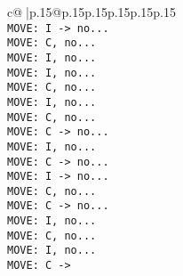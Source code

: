 \documentclass{article}
\begin{document}
{\begin{supertabular}{c@{$\;$}|p{.15\linewidth}@{}p{.15\linewidth}p{.15\linewidth}p{.15\linewidth}p{.15\linewidth}p{.15\linewidth}}
{{{\\ \tt  MOVE: I -> no...\\ \tt  MOVE: C, no...\\ \tt  MOVE: I, no...\\ \tt  MOVE: I, no...\\ \tt  MOVE: C, no...\\ \tt  MOVE: I, no...\\ \tt  MOVE: C, no...\\ \tt  MOVE: C -> no...\\ \tt  MOVE: I, no...\\ \tt  MOVE: C -> no...\\ \tt  MOVE: I -> no...\\ \tt  MOVE: C, no...\\ \tt  MOVE: C -> no...\\ \tt  MOVE: I, no...\\ \tt  MOVE: C, no...\\ \tt  MOVE: I, no...\\ \tt  MOVE: C -> }}}
\end{supertabular}}
\end{document}
